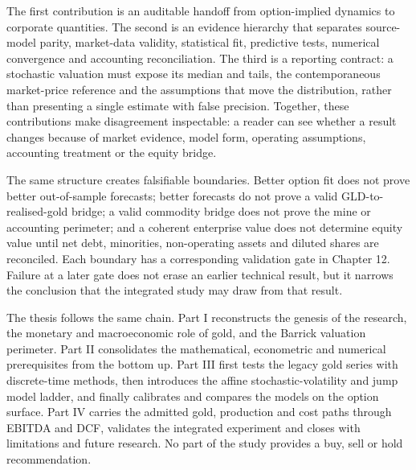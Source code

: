 The first contribution is an auditable handoff from option-implied dynamics to
corporate quantities. The second is an evidence hierarchy that separates
source-model parity, market-data validity, statistical fit, predictive tests,
numerical convergence and accounting reconciliation. The third is a reporting
contract: a stochastic valuation must expose its median and tails, the
contemporaneous market-price reference and the assumptions that move the
distribution, rather than presenting a single estimate with false precision.
Together, these contributions make disagreement inspectable: a reader can see
whether a result changes because of market evidence, model form, operating
assumptions, accounting treatment or the equity bridge.

The same structure creates falsifiable boundaries. Better option fit does not
prove better out-of-sample forecasts; better forecasts do not prove a valid
GLD-to-realised-gold bridge; a valid commodity bridge does not prove the mine
or accounting perimeter; and a coherent enterprise value does not determine
equity value until net debt, minorities, non-operating assets and diluted
shares are reconciled. Each boundary has a corresponding validation gate in
Chapter 12. Failure at a later gate does not erase an earlier technical
result, but it narrows the conclusion that the integrated study may draw from
that result.

The thesis follows the same chain. Part I reconstructs the genesis of the
research, the monetary and macroeconomic role of gold, and the Barrick
valuation perimeter. Part II consolidates the mathematical, econometric and
numerical prerequisites from the bottom up. Part III first tests the legacy
gold series with discrete-time methods, then introduces the affine
stochastic-volatility and jump model ladder, and finally calibrates and
compares the models on the option surface. Part IV carries the admitted gold,
production and cost paths through EBITDA and DCF, validates the integrated
experiment and closes with limitations and future research. No part of the
study provides a buy, sell or hold recommendation.
